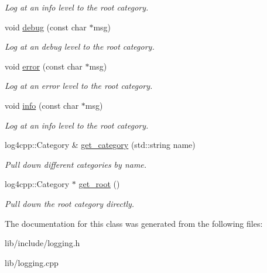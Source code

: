 \begin{DoxyCompactItemize}
\begin{DoxyCompactList}\small\item\em Log at an info level to the root category. \end{DoxyCompactList}\item 
\hypertarget{classLogger_a8e5bf8bea9490c70a1eebb28c042bdb2}{void \hyperlink{classLogger_a8e5bf8bea9490c70a1eebb28c042bdb2}{debug} (const char $\ast$msg)}\label{classLogger_a8e5bf8bea9490c70a1eebb28c042bdb2}

\begin{DoxyCompactList}\small\item\em Log at an debug level to the root category. \end{DoxyCompactList}\item 
\hypertarget{classLogger_ac1d4d3c78b25175e64481f6191f2faee}{void \hyperlink{classLogger_ac1d4d3c78b25175e64481f6191f2faee}{error} (const char $\ast$msg)}\label{classLogger_ac1d4d3c78b25175e64481f6191f2faee}

\begin{DoxyCompactList}\small\item\em Log at an error level to the root category. \end{DoxyCompactList}\item 
\hypertarget{classLogger_ab0a890754ae7bb8bf0431ad52dc4c36c}{void \hyperlink{classLogger_ab0a890754ae7bb8bf0431ad52dc4c36c}{info} (const char $\ast$msg)}\label{classLogger_ab0a890754ae7bb8bf0431ad52dc4c36c}

\begin{DoxyCompactList}\small\item\em Log at an info level to the root category. \end{DoxyCompactList}\item 
\hypertarget{classLogger_a1106b59845fab5f77051dec41a90eb13}{log4cpp\-::\-Category \& \hyperlink{classLogger_a1106b59845fab5f77051dec41a90eb13}{get\-\_\-category} (std\-::string name)}\label{classLogger_a1106b59845fab5f77051dec41a90eb13}

\begin{DoxyCompactList}\small\item\em Pull down different categories by name. \end{DoxyCompactList}\item 
\hypertarget{classLogger_a6dfddca7dd30a19ae61494ff63b5a725}{log4cpp\-::\-Category $\ast$ \hyperlink{classLogger_a6dfddca7dd30a19ae61494ff63b5a725}{get\-\_\-root} ()}\label{classLogger_a6dfddca7dd30a19ae61494ff63b5a725}

\begin{DoxyCompactList}\small\item\em Pull down the root category directly. \end{DoxyCompactList}\end{DoxyCompactItemize}


The documentation for this class was generated from the following files\-:\begin{DoxyCompactItemize}
\item 
lib/include/logging.\-h\item 
lib/logging.\-cpp\end{DoxyCompactItemize}
